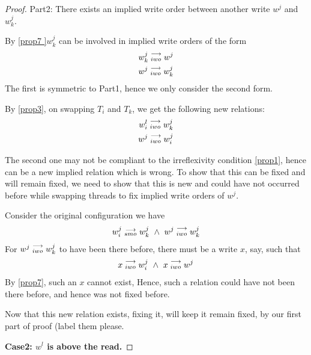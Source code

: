 \begin{proof}
                Part2: There exists an implied write order between another write $w^j$ and $w_k^j$. 
                    
                    By \ref{prop7 }$w_k^j$ can be involved in implied write orders of the form
                    \begin{align}
                        w_k^j\stackrel{\longrightarrow}{_{iwo}}w^j \\
                        w^j\stackrel{\longrightarrow}{_{iwo}}w_k^j 
                    \end{align}
                    The first is symmetric to Part1, hence we only consider the second form. 

                    By \ref{prop3}, on swapping $T_i$ and $T_k$, we get the following new relations:
                    \begin{align}
                        w_i^l\stackrel{\longrightarrow}{_{iwo}}w_k^j \\
                        w^j\stackrel{\longrightarrow}{_{iwo}}w_i^j
                    \end{align}

                    The second one may not be compliant to the irreflexivity condition \ref{prop1}, hence can be a new implied relation which is wrong. To show that this can be fixed and will remain fixed, we need to show that this is new and could have not occurred before while swapping threads to fix implied write orders of $w^j$. 
                    
                    Consider the original configuration we have 
                    \begin{align}
                        \reln{w_i^j}{smo}{w_k^j} \ \wedge \ \reln{w^j}{iwo}{w_k^j}
                    \end{align}
                    For $w^j\stackrel{\longrightarrow}{_{iwo}}w_k^j$ to have been there before, there must be a write $x$, say, such that 
                    \begin{align}
                        \reln{x}{iwo}{w_i^j} \ \wedge \ \reln{x}{iwo}{w^j}
                    \end{align}
                    By \ref{prop7}, such an $x$ cannot exist, Hence, such a relation could have not been there before, and hence was not fixed before.

                    Now that this new relation exists, fixing it, will keep it remain fixed, by our first part of proof (label them please. 
                    
            
            \textbf{Case2: $w^l$ is above the read.}
                

\end{proof}
